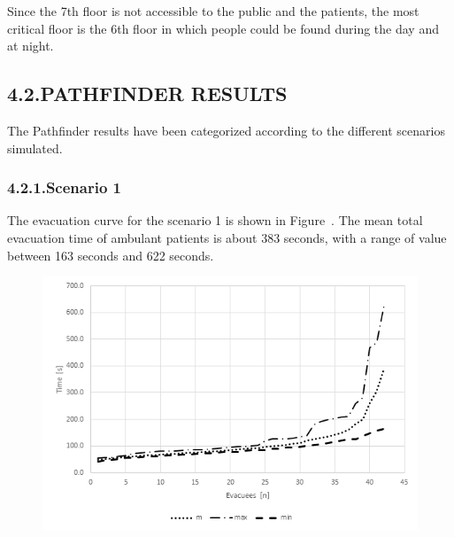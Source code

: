 \documentclass{style/llncs}
\begin{document}
\noindent{}Since the 7th floor is not accessible to the public and the patients, the
most critical floor is the 6th floor in which people could be found
during the day and at night.%

\subsection{4.2.\hspace*{0.5em}PATHFINDER RESULTS}\label{sec-pathfinder-results}%

\noindent{}The Pathfinder results have been categorized according to the different
scenarios simulated.%

\subsubsection{4.2.1.\hspace*{0.5em}Scenario 1}\label{path-s1}%

\noindent{}The evacuation curve for the scenario 1 is shown in Figure~. The mean
total evacuation time of ambulant patients is about 383 seconds, with a
range of value between 163 seconds and 622 seconds.%

\begin{figure}[tbp]%
\begin{mdcenter}%

\noindent{}\includegraphics[keepaspectratio=true,width=\dimmin{}{\dimwidth{1.00}}]{images/evac-curve-scenario1}{}%

\mdhr{}%

\noindent{}%
\end{mdcenter}\label{fig-evac-curve-s1}%
\end{figure}%
\end{document}
